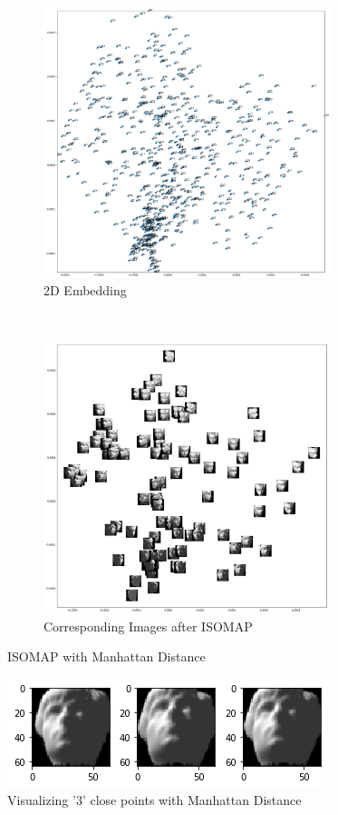 \documentclass[twoside,10pt]{article}
\begin{document}
\begin{enumerate}
\begin{itemize}
\begin{figure}[t!]
    \centering
    \begin{subfigure}[t]{0.5\textwidth}
        \centering
        \includegraphics[height=3.1in]{Images/Q1cembedding.png}
        \caption{2D Embedding}
    \end{subfigure}%
    ~ 
    \begin{subfigure}[t]{0.5\textwidth}
        \centering
        \includegraphics[height=3.1in]{Images/Q1cimages.png}
        \caption{Corresponding Images after ISOMAP}
    \end{subfigure}
    \caption{ISOMAP with Manhattan Distance}
\end{figure}

\begin{figure}[h!]
\begin{center}
\includegraphics[totalheight=2in]{Images/Q1csimilarfaces.png}
\end{center}
\caption{Visualizing '3' close points with Manhattan Distance}
\end{figure}

\end{itemize}

\end{enumerate}
\end{document}
